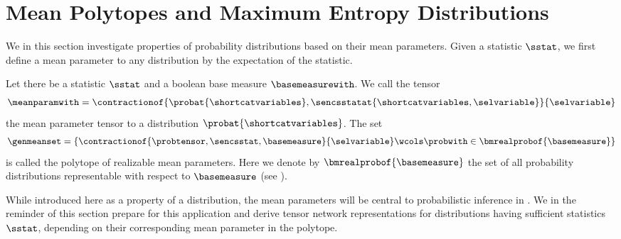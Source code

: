 \chapter{Mean Polytopes and Maximum Entropy Distributions}



We in this section investigate properties of probability distributions based on their mean parameters.
Given a statistic $\sstat$, we first define a mean parameter to any distribution by the expectation of the statistic.

\begin{definition}
    \label{def:meanPolytope}
    Let there be a statistic $\sstat$ and a boolean base measure $\basemeasurewith$.
    We call the tensor
    \begin{align*}
        \meanparamwith
        = \contractionof{\probat{\shortcatvariables},\sencsstatat{\shortcatvariables,\selvariable}}{\selvariable}
    \end{align*}
    the mean parameter tensor to a distribution $\probat{\shortcatvariables}$.
    The set
    \begin{align*}
        \genmeanset
        = \left\{\contractionof{\probtensor,\sencsstat,\basemeasure}{\selvariable}\wcols\probwith\in\bmrealprobof{\basemeasure} \right\}
    \end{align*}
    is called the polytope of realizable mean parameters.
    Here we denote by $\bmrealprobof{\basemeasure}$ the set of all probability distributions representable with respect to $\basemeasure$ (see ).
\end{definition}

While introduced here as a property of a distribution, the mean parameters will be central to probabilistic inference in .
We in the reminder of this section prepare for this application and derive tensor network representations for distributions having sufficient statistics $\sstat$, depending on their corresponding mean parameter in the polytope.


\label{sec:meanPolytopeConvexHull}

